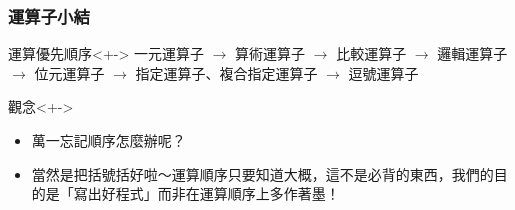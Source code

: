 \documentclass[utf8]{beamer}
\begin{document}
\begin{CJK}{UTF8}{bkai}
\begin{frame}
  \frametitle{運算子小結}
  \begin{exampleblock}{運算優先順序}<+->
  一元運算子 $\rightarrow$ 算術運算子 $\rightarrow$ 比較運算子 $\rightarrow$ 邏輯運算子 $\rightarrow$ 位元運算子 $\rightarrow$ 指定運算子、複合指定運算子 $\rightarrow$ 逗號運算子
  \end{exampleblock}
  \begin{alertblock}{觀念}<+->
    \begin{itemize}
    \item 萬一忘記順序怎麼辦呢？
    \item<+-> 當然是把\alert{括號括好}啦～運算順序只要知道大概，這不是必背的東西，我們的目的是「寫出好程式」而非在運算順序上多作著墨！
    \end{itemize}
  \end{alertblock}
\end{frame}

\clearpage
\end{CJK}
\end{document}
